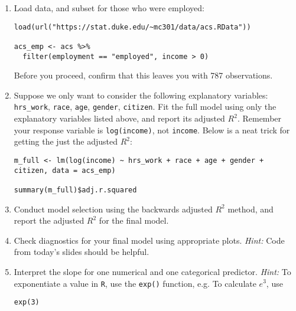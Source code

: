 \documentclass[11pt]{article}
\begin{document}
\begin{enumerate}

\item  Load data, and subset for those who were employed:

\begin{Verbatim}[frame=single, formatcom=\color{blue}]
load(url("https://stat.duke.edu/~mc301/data/acs.RData"))

acs_emp <- acs %>%
  filter(employment == "employed", income > 0)
\end{Verbatim}

Before you proceed, confirm that this leaves you with 787 observations.

\item Suppose we only want to consider the following explanatory variables: \texttt{hrs\_work}, \texttt{race}, 
\texttt{age}, \texttt{gender}, \texttt{citizen}. Fit the full model using only the explanatory variables listed above, 
and report its adjusted $R^2$. Remember your response variable is \texttt{log(income)}, not \texttt{income}. 
Below is a neat trick for getting the just the adjusted $R^2$:

\begin{Verbatim}[frame=single, formatcom=\color{blue}]
m_full <- lm(log(income) ~ hrs_work + race + age + gender + citizen, data = acs_emp)

summary(m_full)$adj.r.squared
\end{Verbatim}

\item Conduct model selection using the backwards adjusted $R^2$ method, and report the adjusted 
$R^2$ for the final model.

\item Check diagnostics for your final model using appropriate plots. \textit{Hint:} Code from today's 
slides should be helpful.

\item Interpret the slope for one numerical and one categorical predictor. \textit{Hint:} To exponentiate a 
value in \texttt{R}, use the \texttt{exp()} function, e.g. To calculate $e^3$, use

\begin{Verbatim}[frame=single, formatcom=\color{blue}]
exp(3)
\end{Verbatim}

\end{enumerate}

%
\end{document}
